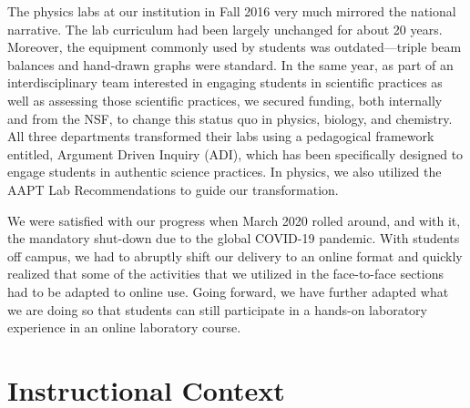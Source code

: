 \documentclass[aip, numerical, preprint]{revtex4-2}
\begin{document}

The physics labs at our institution in Fall 2016 very much mirrored the national narrative.
The lab curriculum had been largely unchanged for about 20 years. Moreover, the equipment
commonly used by students was outdated---triple beam balances and hand-drawn graphs were
standard.  In the same year, as part of an interdisciplinary team interested in engaging
students in scientific practices as well as assessing those scientific practices, we secured
funding, both internally and from the NSF, to change this status quo in physics, biology, and
chemistry.  All three departments transformed their labs using a pedagogical framework
entitled, Argument Driven Inquiry (ADI),\citep{Sampson2011,Walker2011,Walker2016} which has
been specifically designed to engage students in authentic science practices. In physics, we
also utilized the AAPT Lab Recommendations to guide our transformation.\citep{kozminski2014aapt}

We were satisfied with our progress when March 2020 rolled around, and with it, the mandatory
shut-down due to the global COVID-19 pandemic.  With students off campus, we had to abruptly
shift our delivery to an online format and quickly realized that some of the activities that we
utilized in the face-to-face sections had to be adapted to online use.  Going forward, we have
further adapted what we are doing so that students can still participate in a hands-on
laboratory experience in an online laboratory course.


\section{Instructional Context}
\end{document}

